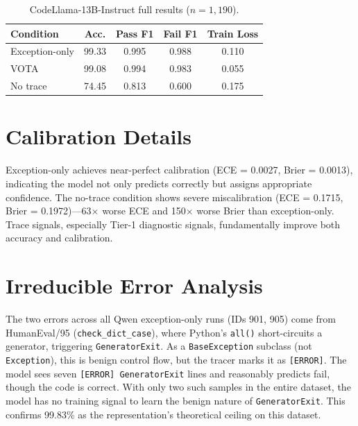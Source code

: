 \documentclass[11pt,a4paper]{article}
\begin{document}
\begin{table}[h]
\centering
\small
\begin{tabular}{lcccc}
\toprule
\textbf{Condition} & \textbf{Acc.} & \textbf{Pass F1} & \textbf{Fail F1} & \textbf{Train Loss} \\
\midrule
Exception-only & 99.33 & 0.995 & 0.988 & 0.110 \\
VOTA           & 99.08 & 0.994 & 0.983 & 0.055 \\
No trace       & 74.45 & 0.813 & 0.600 & 0.175 \\
\bottomrule
\end{tabular}
\caption{CodeLlama-13B-Instruct full results ($n = 1{,}190$).}
\label{tab:codellama-full}
\end{table}

\section{Calibration Details}

Exception-only achieves near-perfect calibration (ECE = 0.0027, Brier = 0.0013), indicating the model not only predicts correctly but assigns appropriate confidence.
The no-trace condition shows severe miscalibration (ECE = 0.1715, Brier = 0.1972)---63$\times$ worse ECE and 150$\times$ worse Brier than exception-only.
Trace signals, especially Tier-1 diagnostic signals, fundamentally improve both accuracy and calibration.

\section{Irreducible Error Analysis}

The two errors across all Qwen exception-only runs (IDs 901, 905) come from HumanEval/95 (\texttt{check\_dict\_case}), where Python's \texttt{all()} short-circuits a generator, triggering \texttt{GeneratorExit}.
As a \texttt{BaseException} subclass (not \texttt{Exception}), this is benign control flow, but the tracer marks it as \texttt{[ERROR]}.
The model sees seven \texttt{[ERROR] GeneratorExit} lines and reasonably predicts fail, though the code is correct.
With only two such samples in the entire dataset, the model has no training signal to learn the benign nature of \texttt{GeneratorExit}.
This confirms 99.83\% as the representation's theoretical ceiling on this dataset.
\end{document}
